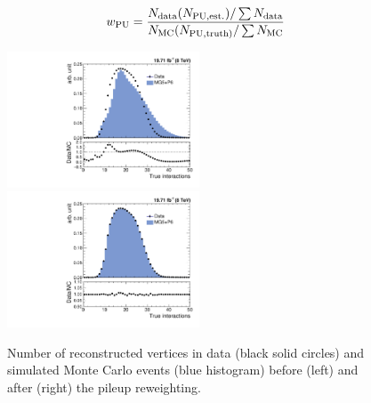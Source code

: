 \begin{equation}
\label{eq:reweigh}
 {w_{\rm PU} = \frac {N_{\rm data} (N_{\rm PU,est.})/\sum N_{\rm data}} {N_{\rm MC} (N_{\rm PU,truth)}/\sum N_{\rm MC}}}
\end{equation}

\begin{figure}[ht]
 \begin{center}
 \hspace*{-5mm}\includegraphics[width=0.51\textwidth]{Plots_HT_2_150/Nvertices.pdf}%
 ~~\includegraphics[width=0.51\textwidth]{Plots_HT_2_150/Nvertices_weight.pdf}
 \caption[Number of reconstructed vertices before (left) and after (right) the pileup reweighting.]{Number of reconstructed vertices in data (black solid circles) and simulated Monte Carlo events (blue histogram) before (left) and after (right) the pileup reweighting.}
 \label{fig:pileup}
 \end{center}
\end{figure}

